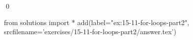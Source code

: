 
\begin{ex}
  \label{ex:15-11-for-loops-part2}
  
  \qed
\end{ex}
\begin{python0}
from solutions import *
add(label="ex:15-11-for-loops-part2",
    srcfilename='exercises/15-11-for-loops-part2/answer.tex')
\end{python0}
